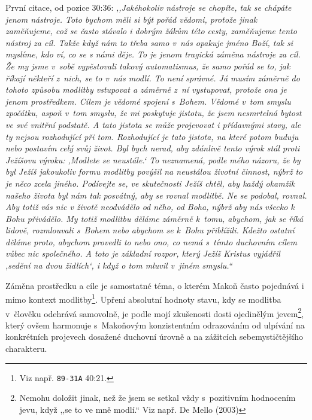 \begin{enumerate}
{    První citace, od pozice 30:36: \textit{%
      ,,Jakéhokoliv nástroje se chopíte, tak se chápáte jenom nástroje. Toto
      bychom měli si být pořád vědomi, protože jinak zaměňujeme, což se často
      stávalo i dobrým žákům této cesty, zaměňujeme tento nástroj za cíl. Takže
      když nám to třeba samo v~nás opakuje jméno Boží, tak si myslíme, kdo ví,
      co se s námi děje. To je jenom tragická záměna nástroje za cíl. Že my jsme
      v~sobě vypěstovali takový automatismus, že samo pořád se to, jak říkají
      někteří z~nich, se to v~nás modlí. To není správné. Já musím záměrně do
      tohoto způsobu modlitby vstupovat a záměrně z~ní vystupovat, protože ona
      je jenom prostředkem. Cílem je vědomé spojení s~Bohem. Vědomé v~tom smyslu
      zpočátku, aspoň v~tom smyslu, že mi poskytuje jistotu, že jsem nesmrtelná
      bytost ve své vnitřní podstatě. A tato jistota se může projevovat i
      přídavnými stavy, ale ty nejsou rozhodující při tom. Rozhodující je tato
      jistota, na které potom buduju nebo postavím celý svůj život. Byl bych
      nerad, aby zdánlivě tento výrok stál proti Ježíšovu výroku: ,Modlete se
      neustále.` To neznamená, podle mého názoru, že by byl Ježíš jakoukoliv
      formu modlitby povýšil na neustálou životní činnost, nýbrž to je něco
      zcela jiného. Podívejte se, ve skutečnosti Ježíš chtěl, aby každý okamžik
      našeho života byl nám tak posvátný, aby se rovnal modlitbě. Ne se podobal,
      rovnal. Aby totiž vás nic v životě neodvádělo od něho, od Boha, nýbrž aby
      nás všecko k Bohu přivádělo. My totiž modlitbu děláme záměrně k~tomu,
      abychom, jak se říká lidově, rozmlouvali s~Bohem nebo abychom se k~Bohu
      přiblížili. Kdežto ostatní děláme proto, abychom provedli to nebo ono, co
      nemá s~tímto duchovním cílem vůbec nic společného. A toto je základní
      rozpor, který Ježíš Kristus vyjádřil ,sedění na dvou židlích`, i když o
      tom mluvil v~jiném smyslu.``
    }

    Záměna prostředku a cíle je samostatné téma, o kterém Makoň často pojednává
    i mimo kontext modlitby\footnote{Viz např. \texttt{89-31A} 40:21.}. Upření absolutní hodnoty stavu, kdy se modlitba
    v~člověku odehrává samovolně, je podle mojí zkušenosti dosti ojedinělým
    jevem\footnote{Nemohu doložit jinak, než že jsem se setkal vždy s~pozitivním
    hodnocením jevu, když ,,se to ve mně modlí.`` Viz např. De Mello
    (2003)\cite{demello2003contact}}, který ovšem harmonuje s~Makoňovým konzistentním odrazováním od
    ulpívání na konkrétních projevech dosažené duchovní úrovně a na zážitcích
    sebemystičtějšího charakteru.

}
\end{enumerate}
